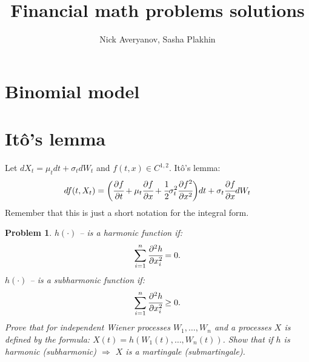 \documentclass[a4paper, 12pt]{article}
\author{Nick Averyanov, Sasha Plakhin}
\title{Financial math problems solutions}
\theoremstyle{problemstyle}
\newtheorem{problem}{Problem}[section]
\begin{document}
\maketitle

\newpage
\tableofcontents{}

\newpage
\section{Binomial model}

\section{Itô's lemma}

Let $dX_t = \mu_t dt + \sigma_t dW_t$ and $f(t, x) \in C^{1,2}$. Itô's lemma:
\begin{equation}
df(t, X_t) = \bigg(\cfrac{\partial f}{\partial t} + \mu_t \cfrac{\partial f}{\partial x}  + \cfrac{1}{2}\sigma^2_t \cfrac{\partial f^2}{\partial x^2} \bigg) dt + \sigma_t \cfrac{\partial f}{\partial x} dW_t 
\end{equation}
Remember that this is just a short notation for the integral form. 

\begin{problem}
$h(\cdot)$ -- is a harmonic function if:
$$
\sum_{i=1}^n \cfrac{\partial^2 h}{\partial x_i^2} = 0.
$$
$h(\cdot) $ -- is a subharmonic function if:
$$
\sum_{i=1}^n \cfrac{\partial^2 h}{\partial x_i^2} \geq 0.
$$
Prove that for independent  Wiener processes $W_1, \ldots, W_n$ and a processes $X$ is defined by the formula: $X(t) = h(W_1(t), \ldots, W_n(t))$. Show that if $h$ is harmonic (subharmonic) $\Rightarrow$  $X$ is a martingale (submartingale).
\end{problem}
\end{document}
